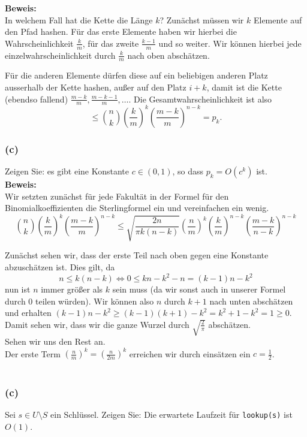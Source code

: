 \documentclass[11pt,a4paper,ngerman]{article}
\begin{document}
\noindent\textbf{Beweis:}\\
In welchem Fall hat die Kette die Länge $k$?
Zunächst müssen wir $k$ Elemente auf den Pfad hashen. Für das erste Elemente haben wir hierbei die Wahrscheinlichkeit $\frac{k}{m}$, für
das zweite $\frac{k-1}{m}$ und so weiter. Wir können hierbei jede einzelwahrscheinlichkeit durch $\frac{k}{m}$ nach oben abschätzen.

Für die anderen Elemente dürfen diese auf ein beliebigen anderen Platz ausserhalb der Kette hashen, außer auf den Platz $i+k$, damit ist die Kette (ebendso fallend) $\frac{m-k}{m}, \frac{m-k-1}{m}, \ldots$. Die Gesamtwahrscheinlichkeit ist also
$$
	\leq \binom{n}{k} \left(\frac{k}{m}\right)^k \left( \frac{m-k}{m} \right)^{n-k} = p_k.
$$

\subsubsection*{(c)}
Zeigen Sie: es gibt eine Konstante $c \in (0,1)$, so dass $p_k = O(c^k)$ ist.\\

\noindent\textbf{Beweis:}\\
Wir setzten zunächst für jede Fakultät in der Formel für den Binomialkoeffizienten die Sterlingformel ein und vereinfachen ein wenig.
$$
	\binom{n}{k} \left(\frac{k}{m}\right)^k \left(\frac{m-k}{m}\right)^{n-k} \leq \sqrt{\frac{2 n}{\pi k (n-k)}} \left( \frac{n}{m} \right)^k \left(\frac{k}{m}\right)^{n-k} \left(\frac{m-k}{n-k}\right)^{n-k}
$$

Zunächst sehen wir, dass der erste Teil nach oben gegen eine Konstante abzuschätzen ist. Dies gilt, da
$$n \leq k (n-k) \Leftrightarrow 0 \leq kn - k^2 - n = (k-1) n - k^2$$
nun ist $n$ immer größer als $k$ sein muss (da wir sonst auch in unserer Formel durch $0$ teilen würden). Wir können also $n$ durch $k+1$
nach unten abschätzen und erhalten $(k-1)n - k^2 \geq (k-1)(k+1) - k^2 = k^2 + 1 - k^2 = 1 \geq 0$. Damit sehen wir, dass wir die ganze Wurzel durch
$\sqrt{\frac{2}{\pi}}$ abschätzen.\\
Sehen wir uns den Rest an.\\
Der erste Term $\left(\frac{n}{m}\right)^k = \left(\frac{n}{2m}\right)^k$  erreichen wir durch einsätzen ein $c = \frac{1}{2}$.\\\


\subsubsection*{(c)}
Sei $s \in U \setminus S$ ein Schlüssel. Zeigen Sie: Die erwartete Laufzeit für \lstinline|lookup(s)| ist $O(1)$.\\
\end{document}

